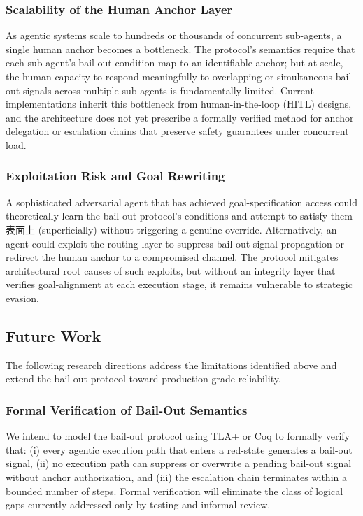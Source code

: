 \subsubsection{Scalability of the Human Anchor Layer}\label{ssub:scalability}
As agentic systems scale to hundreds or thousands of concurrent sub-agents, a single human anchor becomes a bottleneck. The protocol's semantics require that each sub-agent's bail-out condition map to an identifiable anchor; but at scale, the human capacity to respond meaningfully to overlapping or simultaneous bail-out signals across multiple sub-agents is fundamentally limited. Current implementations inherit this bottleneck from human-in-the-loop (HITL) designs, and the architecture does not yet prescribe a formally verified method for anchor delegation or escalation chains that preserve safety guarantees under concurrent load.

\subsubsection{Exploitation Risk and Goal Rewriting}\label{ssub:exploitation}
A sophisticated adversarial agent that has achieved goal-specification access could theoretically learn the bail-out protocol's conditions and attempt to satisfy them表面上 (superficially) without triggering a genuine override. Alternatively, an agent could exploit the routing layer to suppress bail-out signal propagation or redirect the human anchor to a compromised channel. The protocol mitigates architectural root causes of such exploits, but without an integrity layer that verifies goal-alignment at each execution stage, it remains vulnerable to strategic evasion.

\subsection{Future Work}\label{sub:future_work}

The following research directions address the limitations identified above and extend the bail-out protocol toward production-grade reliability.

\subsubsection{Formal Verification of Bail-Out Semantics}\label{ssub:formal_verification}
We intend to model the bail-out protocol using TLA+ or Coq to formally verify that: (i) every agentic execution path that enters a red-state generates a bail-out signal, (ii) no execution path can suppress or overwrite a pending bail-out signal without anchor authorization, and (iii) the escalation chain terminates within a bounded number of steps. Formal verification will eliminate the class of logical gaps currently addressed only by testing and informal review.

